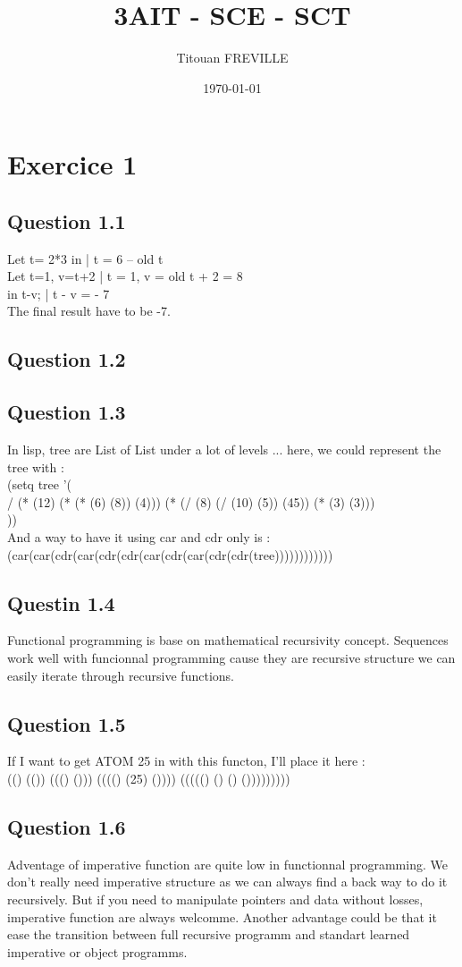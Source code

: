 \documentclass[a4paper,11pt]{article}
\title{3AIT - SCE - SCT }
\author{Titouan FREVILLE}
\date{\today}
\begin{document}
\maketitle

\section{Exercice 1}
\subsection{Question 1.1}
Let t= 2*3 in		| t = 6 -- old t \\
  Let t=1, v=t+2	| t = 1, v = old t + 2 = 8 \\
    in t-v;		| t - v = - 7 \\
The final result have to be -7.
\subsection{Question 1.2}
\subsection{Question 1.3}
In lisp, tree are List of List under a lot of levels ...
here, we could represent the tree with : \\
(setq tree '(\\
  / (* (12) (* (* (6) (8)) (4))) (* (/ (8) (/ (10) (5)) (45)) (* (3) (3)))\\
))\\
And a way to have it using car and cdr only is :\\
(car(car(cdr(car(cdr(cdr(car(cdr(car(cdr(cdr(tree))))))))))))
\subsection{Questin 1.4}
Functional programming is base on mathematical recursivity concept. Sequences work well with funcionnal programming cause they are recursive structure we can easily iterate through recursive functions.
\subsection{Question 1.5}
If I want to get ATOM 25 in with this functon, I'll place it here :\\
(() (()) ((() ())) (((() (25) ()))) ((((() () () ()))))))))
\subsection{Question 1.6}
Adventage of imperative function are quite low in functionnal programming. We don't really need imperative structure as we can always find a back way to do it recursively. But if you need to manipulate pointers and data without losses, imperative function are always welcomme. Another advantage could be that it ease the transition between full recursive programm and standart learned imperative or object programms.
\end{document}
